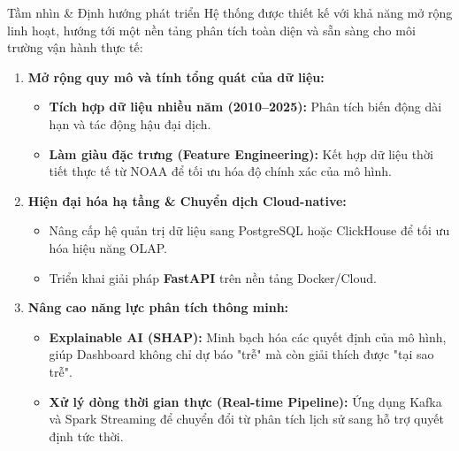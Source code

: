 \begin{frame}{Tầm nhìn \& Định hướng phát triển}
  Hệ thống được thiết kế với khả năng mở rộng linh hoạt, hướng tới một nền tảng phân tích toàn diện và sẵn sàng cho môi trường vận hành thực tế:
  
  \begin{enumerate}
    \item \textbf{Mở rộng quy mô và tính tổng quát của dữ liệu:}
    \begin{itemize}
      \item \textbf{Tích hợp dữ liệu nhiều năm (2010--2025):} Phân tích biến động dài hạn và tác động hậu đại dịch.
      \item \textbf{Làm giàu đặc trưng (Feature Engineering):} Kết hợp dữ liệu thời tiết thực tế từ NOAA để tối ưu hóa độ chính xác của mô hình.
    \end{itemize}

    \item \textbf{Hiện đại hóa hạ tầng \& Chuyển dịch Cloud-native:}
    \begin{itemize}
      \item Nâng cấp hệ quản trị dữ liệu sang PostgreSQL hoặc ClickHouse để tối ưu hóa hiệu năng OLAP.
      \item Triển khai giải pháp \textbf{FastAPI} trên nền tảng Docker/Cloud.
    \end{itemize}

    \item \textbf{Nâng cao năng lực phân tích thông minh:}
    \begin{itemize}
      \item \textbf{Explainable AI (SHAP):} Minh bạch hóa các quyết định của mô hình, giúp Dashboard không chỉ dự báo "trễ" mà còn giải thích được "tại sao trễ".
      \item \textbf{Xử lý dòng thời gian thực (Real-time Pipeline):} Ứng dụng Kafka và Spark Streaming để chuyển đổi từ phân tích lịch sử sang hỗ trợ quyết định tức thời.
    \end{itemize}
  \end{enumerate}
\end{frame}




  


  

